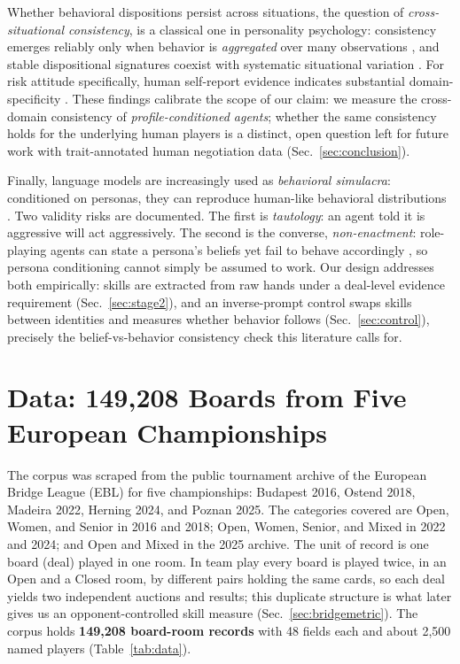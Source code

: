 \documentclass[11pt,a4paper]{article}
\begin{document}
Whether behavioral dispositions persist across situations, the question
of \emph{cross-situational consistency}, is a classical one in
personality psychology: consistency emerges reliably only when behavior
is \emph{aggregated} over many observations \cite{epstein1979stability},
and stable dispositional signatures coexist with systematic situational
variation \cite{mischel1995cognitive}. For risk attitude specifically,
human self-report evidence indicates substantial domain-specificity
\cite{weber2002domain}. These findings calibrate the scope of our claim:
we measure the cross-domain consistency of \emph{profile-conditioned
agents}; whether the same consistency holds for the underlying human
players is a distinct, open question left for future work with
trait-annotated human negotiation data (Sec.~\ref{sec:conclusion}).

Finally, language models are increasingly used as \emph{behavioral
simulacra}: conditioned on personas, they can reproduce human-like
behavioral distributions
\cite{park2023generative,argyle2023out,aher2023using}. Two validity
risks are documented. The first is \emph{tautology}: an agent told it
is aggressive will act aggressively. The second is the converse, \emph{non-enactment}: role-playing agents can state a persona's beliefs
yet fail to behave accordingly \cite{mannekote2025roleplaying}, so
persona conditioning cannot simply be assumed to work. Our design
addresses both empirically: skills are extracted from raw hands under a
deal-level evidence requirement (Sec.~\ref{sec:stage2}), and an
inverse-prompt control swaps
skills between identities and measures whether behavior follows
(Sec.~\ref{sec:control}), precisely the belief-vs-behavior
consistency check this literature calls for.

\section{Data: 149{,}208 Boards from Five European Championships}\label{sec:data}

The corpus was scraped from the public tournament archive of the
European Bridge League (EBL) for five championships: Budapest 2016,
Ostend 2018, Madeira 2022, Herning 2024, and Poznan 2025. The
categories covered are Open, Women, and Senior in 2016 and 2018; Open,
Women, Senior, and Mixed in 2022 and 2024; and Open and Mixed in the
2025 archive. The unit of record is one board (deal) played in one room. In
team play every board is played twice, in an Open and a Closed room, by
different pairs holding the same cards, so each deal yields two
independent auctions and results; this duplicate structure is what
later gives us an opponent-controlled skill measure
(Sec.~\ref{sec:bridgemetric}). The corpus holds \textbf{149{,}208
board-room records} with 48 fields each and about 2{,}500 named
players (Table~\ref{tab:data}).
\end{document}
